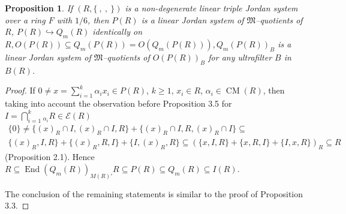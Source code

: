 \documentclass[a4paper,11pt]{article}
\newtheorem{prop}[defi]{Proposition}
\DeclareMathOperator{\End}{End}
\DeclareMathOperator{\CM}{CM}
\begin{document}
\begin{prop}
If ${(R, \{\ ,\ ,\ \})}$ is a non-degenerate linear triple Jordan system over 
a ring $F$ with $1/6$, then $P(R)$ is a linear Jordan system of 
$\mathfrak{M}$--quotients of $R$, ${P(R)\hookrightarrow Q_m(R)}$ identically 
on ${R, O(P(R))\subseteq Q_m(P(R))=O(Q_m(P(R))), Q_m(P(R))_B}$ is a linear 
Jordan system of $\mathfrak{M}$--quotients of $O(P(R))_B$ for any ultrafilter 
$B$ in $B(R)$. 
\end{prop}

\begin{proof}
If ${0\ne x=\sum\limits_{i=1}^k \alpha_i x_i\in P(R)}$, ${k\geq 1}$, 
${x_i\in R}$, ${\alpha_i\in \CM(R)}$, then taking into account the 
observation before Proposition 3.5 for 
${I=\bigcap\limits_{i=1}^k {}_{\alpha_i} R\in \mathcal{E}(R)}$ 
\begin{multline*}
\{0\}\ne 
\{(x)_R\cap I, (x)_R\cap I, R\}+\{(x)_R\cap I, R, (x)_R\cap I\}\subseteq 
\\
\{(x)_R, I, R\}+\{(x)_R, R, I\}+\{I, (x)_R, R\}\subseteq  
(\{x, I, R\}+\{x, R, I\}+\{I, x, R\})_R\subseteq R
\end{multline*}
(Proposition 2.1). Hence ${R\subseteq \End(Q_m(R))_{M(R)'} R\subseteq P(R)\subseteq 
Q_m(R)\subseteq I(R)}$. 

The conclusion of the remaining statements is similar to the proof of 
Proposition 3.3. 
\end{proof}
\end{document}
